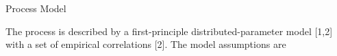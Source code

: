 \documentclass[a0,portrait]{a0poster}
\begin{document}
\begin{multicols}{2}





\begin{tcolorbox}[width=\linewidth, boxrule=0mm, sharp corners=all, colback=white]
	{\LARGE Process Model\\}
	
	The process is described by a first-principle distributed-parameter model [1,2] with a set of empirical correlations [2]. The model assumptions are \\


\end{tcolorbox}
\end{multicols}
\end{document}
